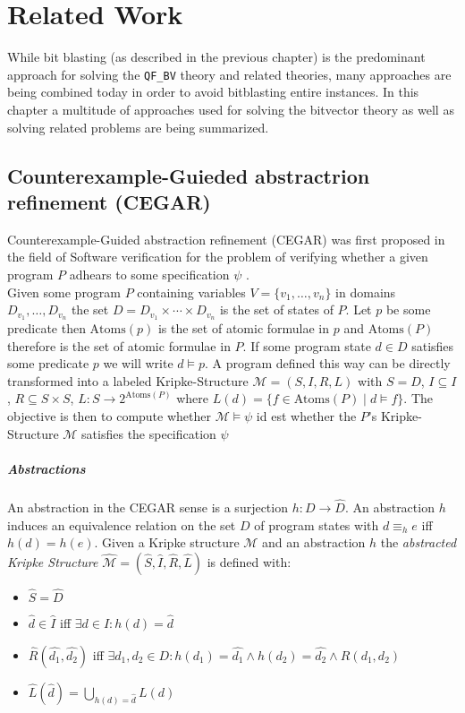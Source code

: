 \chapter{Related Work}
\label{ch:related_work}
While bit blasting (as described in the previous chapter) is the predominant approach for solving the \texttt{QF\_BV} theory and related theories, many approaches are being combined today in order to avoid bitblasting entire instances.
In this chapter a multitude of approaches used for solving the bitvector theory as well as solving related problems are being summarized. 

\section{Counterexample-Guieded abstractrion refinement (CEGAR)}
Counterexample-Guided abstraction refinement (CEGAR) was first proposed in the field of Software verification for the problem of verifying whether a given program $P$ adhears to some specification $\psi$ \cite{CEGAR}.\\
Given some program $P$ containing variables $V=\{v_1,\dots,v_n\}$ in domains $D_{v_1},\dots,D_{v_n}$ the set $D=D_{v_1}\times\dotsi\times D_{v_n}$ is the set of states of $P$. Let $p$ be some predicate then $\text{Atoms}\left(p\right)$ is the set of atomic formulae in $p$ and $\text{Atoms}\left(P\right)$ therefore is the set of atomic formulae in $P$. If some program state $d\in D$ satisfies some predicate $p$ we will write $d\vDash p$. A program defined this way can be directly transformed into a labeled Kripke-Structure $\mathcal{M}=\left(S,I,R,L\right)$ with $S=D$, $I\subseteq I$, $R \subseteq S \times S$, $L\colon S \to 2^{\text{Atoms}\left(P\right)}$ where $L\left(d\right) = \{ f \in \text{Atoms}\left(P\right) \mid d \vDash f \}$. The objective is then to compute whether $\mathcal{M}\vDash\psi$ id est whether the $P$'s Kripke-Structure $\mathcal{M}$ satisfies the specification $\psi$
\paragraph{Abstractions}
An abstraction in the CEGAR sense is a surjection $h\colon D \to \hat{D}$. An abstraction $h$ induces an equivalence relation on the set $D$ of program states with $d \equiv_h e$ iff $h\left(d\right) = h\left(e\right)$. Given a Kripke structure $\mathcal{M}$ and an abstraction $h$ the \textit{abstracted Kripke Structure} $\hat{\mathcal{M}} = \left(\hat{S},\hat{I},\hat{R},\hat{L}\right)$ is defined with:
\begin{itemize}
    \item $\hat{S} = \hat{D}$
    \item $\hat{d} \in \hat{I}$ iff $\exists d \in I\colon h\left(d\right) = \hat{d}$
    \item $\hat{R}\left(\hat{d_1},\hat{d_2}\right)$ iff $\exists d_1,d_2 \in D\colon h\left(d_1\right) = \hat{d_1} \land h\left(d_2\right) = \hat{d_2} \land R\left(d_1, d_2\right)$
    \item $\hat{L}\left(\hat{d}\right)=\bigcup\limits_{h\left(d\right)=\hat{d}} L\left(d\right)$
\end{itemize}

